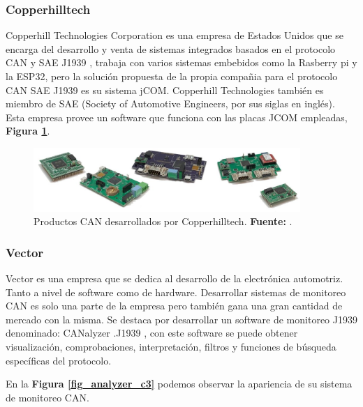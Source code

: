 \subsubsection{Copperhilltech}
Copperhill Technologies Corporation es una empresa de Estados Unidos que se encarga del desarrollo y venta de sistemas integrados basados en el protocolo CAN y SAE J1939 \cite{cite_copper_c3}, trabaja con varios sistemas embebidos como la Rasberry pi y la ESP32,  pero la solución propuesta de la propia compañia  para el protocolo CAN SAE J1939 es su sistema jCOM.   Copperhill Technologies también es miembro de SAE (Society of Automotive Engineers, por sus siglas en inglés). Esta empresa provee un software que funciona con las placas JCOM empleadas, \textbf{Figura \ref{fig_copper_c3}}. 


\begin{figure}[H]
	\centering
	\includegraphics[width=0.9\textwidth]{./Cap3imagen/copperhill.jpg}
	\caption[Productos CAN desarrollados por Copperhilltech .]{Productos CAN desarrollados por Copperhilltech.\textbf{ Fuente:} \cite{cite_copper_c3}.}
	\label{fig_copper_c3} %
\end{figure}

\subsubsection{Vector}
Vector es una empresa que se dedica al  desarrollo de la electrónica automotriz.  Tanto a nivel de software como de hardware. Desarrollar sistemas de monitoreo CAN es solo una parte de la empresa pero también gana una gran cantidad de mercado con la misma. Se destaca por desarrollar un software de monitoreo J1939 denominado: CANalyzer .J1939 \cite{cite_analyzer_c3}, con este software se puede obtener visualización, comprobaciones, interpretación, filtros y funciones de búsqueda específicas del protocolo. 

En la \textbf{Figura \ref{fig_analyzer_c3}} podemos observar la apariencia de su sistema de monitoreo CAN. 


